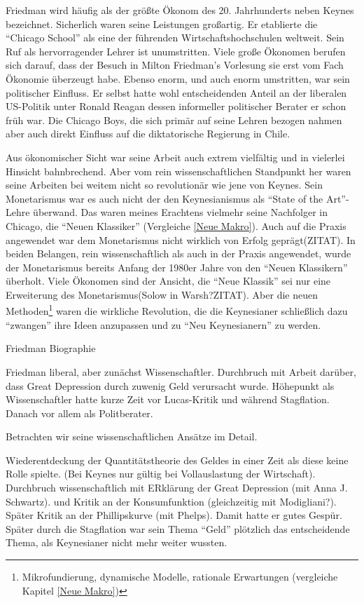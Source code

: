 Friedman wird häufig als der größte Ökonom des 20. Jahrhunderts neben Keynes bezeichnet. Sicherlich waren seine Leistungen großartig. Er etablierte die "`Chicago School"' als eine der führenden Wirtschaftshochschulen weltweit. Sein Ruf als hervorragender Lehrer ist unumstritten. Viele große Ökonomen berufen sich darauf, dass der Besuch in Milton Friedman's Vorlesung sie erst vom Fach Ökonomie überzeugt habe. Ebenso enorm, und auch enorm umstritten, war sein politischer Einfluss. Er selbst hatte wohl entscheidenden Anteil an der liberalen US-Politik unter Ronald Reagan dessen informeller politischer Berater er schon früh war. Die Chicago Boys, die sich primär auf seine Lehren bezogen nahmen aber auch direkt Einfluss auf die diktatorische Regierung in Chile.

Aus ökonomischer Sicht war seine Arbeit auch extrem vielfältig und in vielerlei Hinsicht bahnbrechend. Aber vom rein wissenschaftlichen Standpunkt her waren seine Arbeiten bei weitem nicht so revolutionär wie jene von Keynes. Sein Monetarismus war es auch nicht der den Keynesianismus als "`State of the Art"'-Lehre überwand. Das waren meines Erachtens vielmehr seine Nachfolger in Chicago, die "`Neuen Klassiker"' (Vergleiche \ref{Neue Makro}). Auch auf die Praxis angewendet war dem Monetarismus nicht wirklich von Erfolg geprägt(ZITAT). In beiden Belangen, rein wissenschaftlich als auch in der Praxis angewendet, wurde der Monetarismus bereits Anfang der 1980er Jahre von den "`Neuen Klassikern"' überholt. Viele Ökonomen sind der Ansicht, die "`Neue Klassik"' sei nur eine Erweiterung des Monetarismus(Solow in Warsh?ZITAT). Aber die neuen Methoden\footnote{Mikrofundierung, dynamische Modelle, rationale Erwartungen (vergleiche Kapitel \ref{Neue Makro})} waren die wirkliche Revolution, die die Keynesianer schließlich dazu "`zwangen"' ihre Ideen anzupassen und zu "`Neu Keynesianern"' zu werden.

Friedman Biographie

Friedman liberal, aber zunächst Wissenschaftler. Durchbruch mit Arbeit darüber, dass Great Depression durch zuwenig Geld verursacht wurde. Höhepunkt als Wissenschaftler hatte kurze Zeit vor Lucas-Kritik und während Stagflation. Danach vor allem als Politberater.




Betrachten wir seine wissenschaftlichen Ansätze im Detail.

Wiederentdeckung der Quantitätstheorie des Geldes in einer Zeit als diese keine Rolle spielte. (Bei Keynes nur gültig bei Vollauslastung der Wirtschaft). Durchbruch wissenschaftlich mit ERklärung der Great Depression (mit Anna J. Schwartz). und Kritik an der Konsumfunktion (gleichzeitig mit Modigliani?). Später Kritik an der Phillipskurve (mit Phelps).
Damit hatte er gutes Gespür. Später durch die Stagflation war sein Thema "`Geld"' plötzlich das entscheidende Thema, als Keynesianer nicht mehr weiter wussten.


